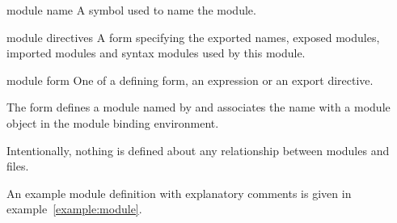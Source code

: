 \begin{optDefinition}
{\begin{syntax}
    \end{syntax}}
%
%
\begin{arguments}
    \item[module name] A symbol used to name the module.
    \item[module directives] A form specifying the exported names, exposed
    modules, imported modules and syntax modules used by this module.
    \item[module form] One of a defining form, an expression or an export
    directive.
\end{arguments}
%
\remarks%
The  form defines a module named by 
and associates the name  with a module object in the
module binding environment.
\begin{note}
    Intentionally, nothing is defined about any relationship between modules and
    files.
\end{note}
%
\examples
An example module definition with explanatory comments is given in
example~\ref{example:module}.
%
\end{optDefinition}
%
\label{directives}
%
